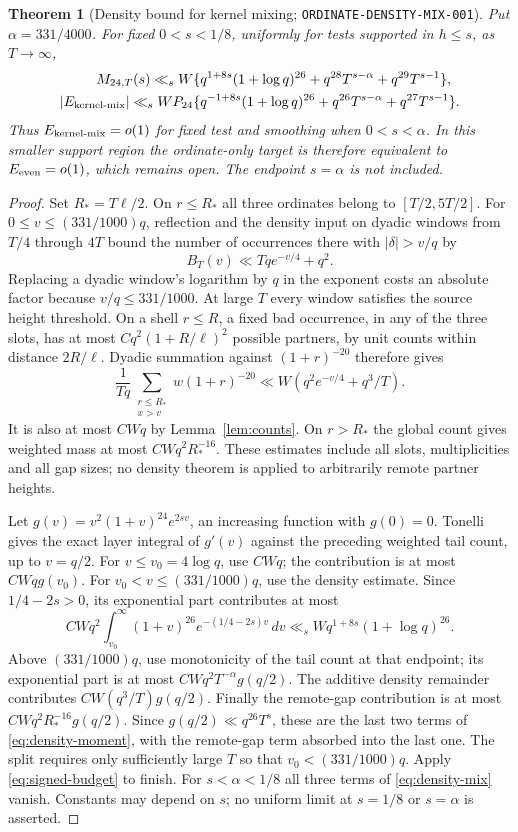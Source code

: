 \documentclass[11pt]{article}
\newtheorem{theorem}[lemma]{Theorem}
\newcommand{\dd}{\,d}
\begin{document}
\begin{theorem}[Density bound for kernel mixing; \texttt{ORDINATE-DENSITY-MIX-001}]
\label{thm:density-mix}
Put $\alpha=331/4000$. For fixed $0<s<1/8$, uniformly for tests supported
in $h\leq s$, as $T\to\infty$,
\begin{align}
 M_{24,T}(s)\ll_s W\{&q^{1+8s}(1+\log q)^{26}
                +q^{28}T^{s-\alpha}+q^{29}T^{s-1}\},\label{eq:density-moment}\\
 |E_{\rm kernel\text{-}mix}|\ll_s WP_{24}\{&q^{-1+8s}(1+\log q)^{26}
                +q^{26}T^{s-\alpha}+q^{27}T^{s-1}\}.\label{eq:density-mix}
\end{align}
Thus $E_{\rm kernel\text{-}mix}=o(1)$ for fixed test and smoothing when
$0<s<\alpha$. In this smaller support region the ordinate-only target is
therefore equivalent to $E_{\rm even}=o(1)$, which remains open.
The endpoint $s=\alpha$ is not included.
\end{theorem}
\begin{proof}
Set $R_*=T\ell/2$. On $r\leq R_*$ all three ordinates belong to
$[T/2,5T/2]$. For $0\leq v\leq(331/1000)q$, reflection and the density
input on dyadic windows from $T/4$ through $4T$ bound the number of
occurrences there with $|\delta|>v/q$ by
\[
 B_T(v)\ll Tq e^{-v/4}+q^2.
\]
Replacing a dyadic window's logarithm by $q$ in the exponent costs an
absolute factor because $v/q\leq331/1000$. At large $T$ every window
satisfies the source height threshold. On a shell $r\leq R$, a fixed bad
occurrence, in any of the three slots, has at most
$Cq^2(1+R/\ell)^2$ possible partners, by unit counts within distance
$2R/\ell$. Dyadic summation against $(1+r)^{-20}$ therefore gives
\[
 \frac1{Tq}\sum_{\substack{r\leq R_*\\x>v}}w(1+r)^{-20}
       \ll W(q^2e^{-v/4}+q^3/T).
\]
It is also at most $CWq$ by Lemma~\ref{lem:counts}. On $r>R_*$ the
global count gives weighted mass at most $CWq^2R_*^{-16}$.
These estimates include all slots, multiplicities and all gap sizes;
no density theorem is applied to arbitrarily remote partner heights.

Let $g(v)=v^2(1+v)^{24}e^{2sv}$, an increasing function with $g(0)=0$.
Tonelli gives the exact layer integral of $g'(v)$ against the preceding
weighted tail count, up to $v=q/2$. For $v\leq v_0=4\log q$, use
$CWq$; the contribution is at most $CWqg(v_0)$.
For $v_0<v\leq(331/1000)q$, use the density estimate. Since
$1/4-2s>0$, its exponential part contributes at most
\[
 CWq^2\int_{v_0}^\infty(1+v)^{26}e^{-(1/4-2s)v}\dd v
 \ll_s Wq^{1+8s}(1+\log q)^{26}.
\]
Above $(331/1000)q$, use monotonicity of the tail count at that endpoint;
its exponential part is at most $CWq^2T^{-\alpha}g(q/2)$.
The additive density remainder contributes $CW(q^3/T)g(q/2)$.
Finally the remote-gap contribution is at most
$CWq^2R_*^{-16}g(q/2)$. Since $g(q/2)\ll q^{26}T^s$, these are the
last two terms of \eqref{eq:density-moment}, with the remote-gap term
absorbed into the last one. The split requires only sufficiently large
$T$ so that $v_0<(331/1000)q$.
Apply \eqref{eq:signed-budget} to finish. For $s<\alpha<1/8$ all three
terms of \eqref{eq:density-mix} vanish. Constants may depend on $s$;
no uniform limit at $s=1/8$ or $s=\alpha$ is asserted.
\end{proof}
\end{document}
